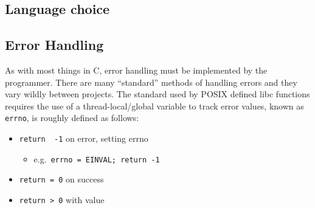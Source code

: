     \subsection{Language choice}

    \subsection{Error Handling}
        As with most things in C, error handling must be implemented by the programmer. There are many ``standard'' methods of handling errors and they vary wildly between projects. The standard used by POSIX defined libc functions requires the use of a thread-local/global variable to track error values, known as \texttt{errno}, is roughly defined as follows:
        \begin{center}
            \begin{minipage}{0.88\columnwidth}
                \begin{itemize}[noitemsep]
                    \item{\texttt{return\ \ -1} on error, setting errno}
                        \begin{itemize}
                            \item[]{\small e.g.\ \texttt{errno = EINVAL;\ return -1}}
                        \end{itemize}
                    \item{\texttt{return = 0} on success}
                    \item{\texttt{return > 0} with value}
                \end{itemize}
            \end{minipage}
        \end{center}
        \vspace{\parskip}

